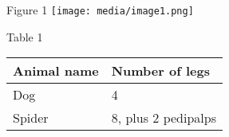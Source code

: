 Figure 1
\texttt{[image: media/image1.png]}

Table 1
\begin{longtable}[]{@{}ll@{}}
\toprule
\textbf{Animal name} & \textbf{Number of legs} \\
\midrule
\endhead
Dog & 4 \\
Spider & 8, plus 2 pedipalps \\
\bottomrule
\end{longtable}


